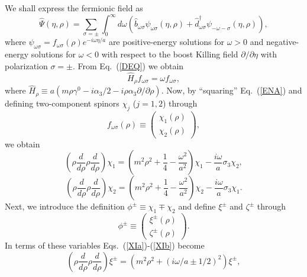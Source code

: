 \documentclass[12pt,nofootinbib,floatfix,aps,prd,showpacs,amsmath,amssymb,eqsecnum]{revtex4-2}
\begin{document}
We shall express the fermionic field as
\begin{equation}
\hat \Psi(\eta,\rho)\!= \! \sum_{\sigma = \pm } 
\int_{0}^{\infty} \! d\omega
\left( \hat b_{\omega \sigma} \psi_{\omega \sigma}(\eta,\rho)
       + \hat d^\dagger_{\omega \sigma} \psi_{-\omega -\sigma}(\eta,\rho) 
\right), 
\label{PSA}
\end{equation}
where $\psi_{\omega \sigma}=f_{\omega \sigma}(\rho) e^{-i \omega \eta/a}$
are positive-energy solutions for $\omega >0$  and negative-energy
solutions for $\omega <0$ with respect to the boost Killing field 
$\partial / \partial \eta$ with polarization $\sigma = \pm$.
{}From Eq.~(\ref{DEQ}) we obtain
\begin{equation}
\hat H_\rho f_{\omega \sigma} = \omega f_{\omega \sigma},
\label{ENA}
\end{equation}
where
$
\hat H_\rho \equiv  a 
( m \rho \gamma^0 - {i \alpha_3}/{2} - 
i \rho \alpha_3 {\partial}/{\partial \rho})
$.
Now, by ``squaring'' Eq.~(\ref{ENA}) and defining two-component 
spinors $\chi_{j}$ ($j=1,2$) through 
\begin{equation}
 f_{\omega \sigma}(\rho) \equiv 
\left(
\begin{array}{c}
\chi_1 (\rho) \\
\chi_2 (\rho) 
\end{array}
\right),
\label{(4.5)}
\end{equation}
we obtain 
\begin{equation}
\left( 
\rho \frac{d}{d\rho} \rho\frac{d}{d\rho} 
\right) \chi_1 
 = 
\left( 
m^2 \rho^2 + \frac{1}{4} - \frac{\omega^2}{a^2} 
\right) \chi_1
-\frac{i \omega}{a}\sigma_3 \chi_2,
\label{XIa}
\end{equation}
\begin{equation}
\left( 
\rho \frac{d}{d\rho} \rho\frac{d}{d\rho} 
\right)  \chi_2
 = 
\left( 
m^2 \rho^2 + \frac{1}{4} - \frac{\omega^2}{a^2} 
\right) \chi_2
-\frac{i \omega}{a}\sigma_3 \chi_1  .
\label{XIb}
\end{equation} 
Next, we introduce the definition  $\phi^\pm \equiv \chi_1 \mp \chi_2$
and define $\xi^\pm $ and $\zeta^\pm $ through 
\begin{equation}
\phi^\pm \equiv 
\left(
\begin{array}{c}
\xi^\pm (\rho) \\
\zeta^\pm (\rho) 
\end{array}
\right) .
\label{(4.7)}
\end{equation}
In terms of these variables Eqs.~(\ref{XIa})-(\ref{XIb}) become 
\begin{equation}
\left( \rho\frac{d}{d\rho}\rho\frac{d}{d\rho} \right) \xi^\pm 
= 
(m^2\rho^2+(i\omega/a \pm 1/2)^2) \xi^\pm,
\label{(4.8)}
\end{equation}
\end{document}
